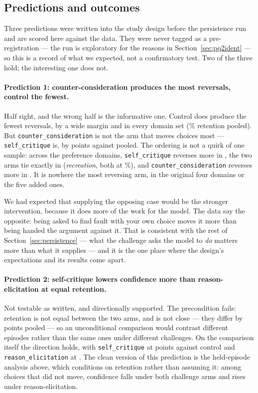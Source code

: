\subsection{Predictions and outcomes}
\label{sec:predictions}

Three predictions were written into the study design before the persistence run and are
scored here against the data. They were never tagged as a pre-registration --- the run
is exploratory for the reasons in Section~\ref{sec:pq2ident} --- so this is a record of
what we expected, not a confirmatory test. Two of the three hold; the interesting one
does not.

\paragraph{Prediction 1: counter-consideration produces the most reversals, control the
fewest.} Half right, and the wrong half is the informative one. Control does produce the
fewest reversals, by a wide margin and in every domain set (\pqxpRetCtl{}\% retention
pooled). But \texttt{counter\_consideration} is not the arm that moves choices most ---
\texttt{self\_critique} is, by \pqxpDiffCritique{} points against \pqxpDiffCounter{}
pooled. The ordering is not a quirk of one sample: across the \pqxPredOneOf{} preference
domains, \texttt{self\_critique} reverses more in \pqxPredOneDoms{}, the two arms tie
exactly in \pqxPredOneTied{} (\emph{recreation}, both at
\pqRecRetCritique{}\%), and \texttt{counter\_consideration} reverses more in
\pqxPredOneCounterMore{}. It is nowhere the most reversing arm, in the original four
domains or the five added ones.

We had expected that supplying the opposing case would be the stronger intervention,
because it does more of the work for the model. The data say the opposite: being asked to
find fault with your own choice moves it more than being handed the argument against it.
That is consistent with the rest of Section~\ref{sec:persistence} --- what the challenge
asks the model to \emph{do} matters more than what it supplies --- and it is the one
place where the design's expectations and its results come apart.

\paragraph{Prediction 2: self-critique lowers confidence more than reason-elicitation at
equal retention.} Not testable as written, and directionally supported. The precondition
fails: retention is not equal between the two arms, and is not close --- they differ by
\pqxPredTwoRetGap{} points pooled --- so an unconditional comparison would contrast
different episodes rather than the same ones under different challenges. On the
comparison itself the direction holds, with \texttt{self\_critique} at
\pqxpConfCritique{} points against control and \texttt{reason\_elicitation} at
\pqxpConfReason{}. The clean version of this prediction is the held-episode analysis
above, which conditions on retention rather than assuming it: among choices that did not
move, confidence falls under both challenge arms and rises under reason-elicitation.

